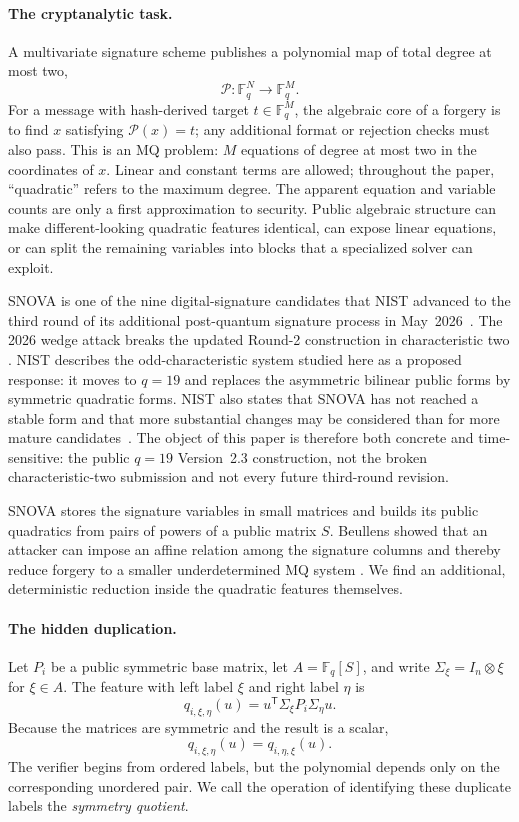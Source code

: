 \documentclass[11pt]{article}
\newcommand{\F}{\mathbb F}
\newcommand{\transpose}{\mathsf T}
\newcommand{\SNOVA}{\textsf{SNOVA}}
\begin{document}
\paragraph{The cryptanalytic task.}
A multivariate signature scheme publishes a polynomial map of total degree
at most two,
\[
  \mathcal P:\F_q^{N}\longrightarrow\F_q^{M}.
\]
For a message with hash-derived target $t\in\F_q^M$, the algebraic core of a
forgery is to find $x$ satisfying $\mathcal P(x)=t$; any additional format or
rejection checks must also pass.  This is an MQ problem: $M$ equations of
degree at most two in the coordinates of $x$.  Linear and constant terms are
allowed; throughout the paper, ``quadratic'' refers to the maximum degree.
The apparent equation and variable counts are only a first approximation to
security.  Public algebraic structure can make different-looking quadratic
features identical, can expose linear equations, or can split the remaining
variables into blocks that a specialized solver can exploit.

\SNOVA{} is one of the nine digital-signature candidates that NIST advanced to
the third round of its additional post-quantum signature process in
May~2026~\cite{NISTThirdRound2026,NISTIR8610}.  The 2026 wedge attack breaks
the updated Round-2 construction in characteristic two
\cite{BrosEtAl2026SNOVAWedge}.  NIST describes the odd-characteristic system
studied here as a proposed response: it moves to $q=19$ and replaces the
asymmetric bilinear public forms by symmetric quadratic forms.  NIST also
states that \SNOVA{} has not reached a stable form and that more substantial
changes may be considered than for more mature candidates~\cite{NISTIR8610}.
The object of this paper is therefore both concrete and time-sensitive: the
public $q=19$ Version~2.3 construction, not the broken characteristic-two
submission and not every future third-round revision.

\SNOVA{} stores the signature variables in small matrices and builds its public
quadratics from pairs of powers of a public matrix $S$.  Beullens showed that
an attacker can impose an affine relation among the signature columns and
thereby reduce forgery to a smaller underdetermined MQ system
\cite{Beullens2024SNOVA}.  We find an additional, deterministic reduction
inside the quadratic features themselves.

\paragraph{The hidden duplication.}
Let $P_i$ be a public symmetric base matrix, let
$A=\F_q[S]$, and write $\Sigma_\xi=I_n\otimes\xi$ for $\xi\in A$.  The feature
with left label $\xi$ and right label $\eta$ is
\[
  q_{i,\xi,\eta}(u)
  =u^\transpose\Sigma_\xi P_i\Sigma_\eta u.
\]
Because the matrices are symmetric and the result is a scalar,
\begin{equation}\label{eq:intro-swap}
  q_{i,\xi,\eta}(u)=q_{i,\eta,\xi}(u).
\end{equation}
The verifier begins from ordered labels, but the polynomial depends only on
the corresponding unordered pair.  We call the operation of identifying
these duplicate labels the \emph{symmetry quotient}.
\end{document}
